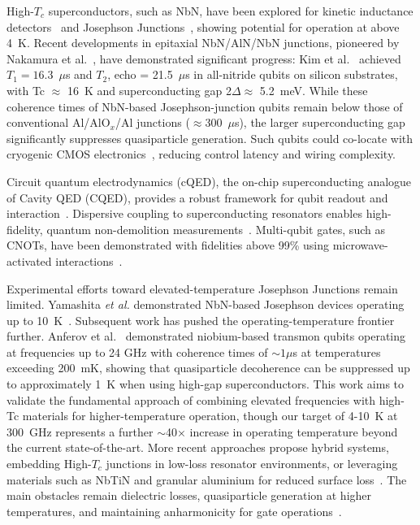 High-$T_c$ superconductors, such as NbN, have been explored for kinetic inductance detectors~\cite{zmuidzinas2012superconducting} and Josephson Junctions~\cite{tafuriHIGH-TC2014}, showing potential for operation at above 4~K. Recent developments in epitaxial NbN/AlN/NbN junctions, pioneered by Nakamura et al.~\cite{nakamura2011epitaxialNbN}, have demonstrated significant progress: Kim et al.~\cite{kim2021} achieved $T_1 = 16.3$~$\mu$s and $T_2$, echo = 21.5~$\mu$s in all-nitride qubits on silicon substrates, with Tc $\approx $ 16~K and superconducting gap 2$\Delta \approx $ 5.2~meV. While these coherence times of NbN-based Josephson-junction qubits remain below those of conventional Al/AlO$_x$/Al junctions ($\approx 300$~$\mu$s), the larger superconducting gap significantly suppresses quasiparticle generation. Such qubits could co-locate with cryogenic CMOS electronics~\cite{yang2019cryoBGR}, reducing control latency and wiring complexity.

Circuit quantum electrodynamics (cQED), the on-chip superconducting analogue of Cavity QED (CQED), provides a robust framework for qubit readout and interaction~\cite{blais2021circuit}. Dispersive coupling to superconducting resonators enables high-fidelity, quantum non-demolition measurements~\cite{Schuster2005PRL,blais2021circuit}. Multi-qubit gates, such as CNOTs, have been demonstrated with fidelities above 99\% using microwave-activated interactions~\cite{Barends2014}.

Experimental efforts toward elevated-temperature Josephson Junctions remain limited. Yamashita \emph{et al.} demonstrated NbN-based Josephson devices operating up to 10~K~\cite{yamashita17highTc}. Subsequent work has pushed the operating-temperature frontier further. 
Anferov et al.~\cite{Anferov2024HighTemp} demonstrated niobium-based transmon qubits operating at frequencies up to 24 GHz with coherence times of $\sim 1 \mu$s at temperatures exceeding 200~mK, showing that quasiparticle decoherence can be suppressed up to approximately 1~K when using high-gap superconductors. This work aims to validate the fundamental approach of combining elevated frequencies with high-Tc materials for higher-temperature operation, though our target of 4-10~K at 300~GHz represents a further $\sim$40× increase in operating temperature beyond the current state-of-the-art. More recent approaches propose hybrid systems, embedding High-$T_c$ junctions in low-loss resonator environments, or leveraging materials such as NbTiN and granular aluminium for reduced surface loss~\cite{grunhaupt2019granular}. The main obstacles remain dielectric losses, quasiparticle generation at higher temperatures, and maintaining anharmonicity for gate operations~\cite{Martinis2005TLS, Muller2019TLS, Catelani2011QP, Wang2014QP, Koch2007Transmon, Peterer2015Multilevel}.

